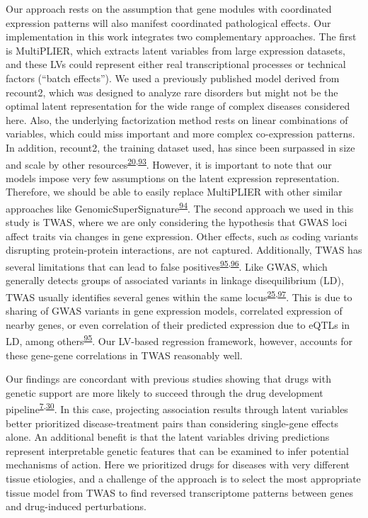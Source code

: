 \documentclass[
  a4paper,
]{article}
\begin{document}
Our approach rests on the assumption that gene modules with coordinated expression patterns will also manifest coordinated pathological effects.
Our implementation in this work integrates two complementary approaches.
The first is MultiPLIER, which extracts latent variables from large expression datasets, and these LVs could represent either real transcriptional processes or technical factors (``batch effects'').
We used a previously published model derived from recount2, which was designed to analyze rare disorders but might not be the optimal latent representation for the wide range of complex diseases considered here.
Also, the underlying factorization method rests on linear combinations of variables, which could miss important and more complex co-expression patterns.
In addition, recount2, the training dataset used, has since been surpassed in size and scale by other resources\textsuperscript{\protect\hyperlink{ref-Nz3IMEzd}{20},\protect\hyperlink{ref-TPVeG4GP}{93}}.
However, it is important to note that our models impose very few assumptions on the latent expression representation.
Therefore, we should be able to easily replace MultiPLIER with other similar approaches like GenomicSuperSignature\textsuperscript{\protect\hyperlink{ref-X4fhSCkz}{94}}.
The second approach we used in this study is TWAS, where we are only considering the hypothesis that GWAS loci affect traits via changes in gene expression.
Other effects, such as coding variants disrupting protein-protein interactions, are not captured.
Additionally, TWAS has several limitations that can lead to false positives\textsuperscript{\protect\hyperlink{ref-l6ogswV3}{95},\protect\hyperlink{ref-ndd3tW4g}{96}}.
Like GWAS, which generally detects groups of associated variants in linkage disequilibrium (LD), TWAS usually identifies several genes within the same locus\textsuperscript{\protect\hyperlink{ref-Z8bvDdVq}{25},\protect\hyperlink{ref-AxVJwanp}{97}}.
This is due to sharing of GWAS variants in gene expression models, correlated expression of nearby genes, or even correlation of their predicted expression due to eQTLs in LD, among others\textsuperscript{\protect\hyperlink{ref-l6ogswV3}{95}}.
Our LV-based regression framework, however, accounts for these gene-gene correlations in TWAS reasonably well.

Our findings are concordant with previous studies showing that drugs with genetic support are more likely to succeed through the drug development pipeline\textsuperscript{\protect\hyperlink{ref-REXpV7nA}{7},\protect\hyperlink{ref-17oeJ0CXy}{30}}.
In this case, projecting association results through latent variables better prioritized disease-treatment pairs than considering single-gene effects alone.
An additional benefit is that the latent variables driving predictions represent interpretable genetic features that can be examined to infer potential mechanisms of action.
Here we prioritized drugs for diseases with very different tissue etiologies, and a challenge of the approach is to select the most appropriate tissue model from TWAS to find reversed transcriptome patterns between genes and drug-induced perturbations.
\end{document}
